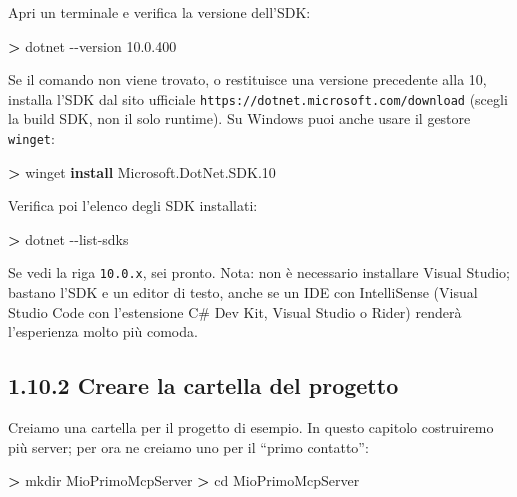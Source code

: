 \documentclass[
  italian,
  10pt,
]{book}
\newenvironment{Shaded}{\begin{snugshade}}{\end{snugshade}}
\newcommand{\ExtensionTok}[1]{#1}
\newcommand{\FunctionTok}[1]{\textcolor[rgb]{0.13,0.29,0.53}{\textbf{#1}}}
\newcommand{\NormalTok}[1]{#1}
\newcommand{\OperatorTok}[1]{\textcolor[rgb]{0.81,0.36,0.00}{\textbf{#1}}}
\begin{document}
Apri un terminale e verifica la versione dell'SDK:

\begin{Shaded}
\begin{Highlighting}[]
\OperatorTok{\textgreater{}}\NormalTok{ dotnet }\ExtensionTok{{-}{-}version}
\ExtensionTok{10.0.400}
\end{Highlighting}
\end{Shaded}

Se il comando non viene trovato, o restituisce una versione precedente
alla 10, installa l'SDK dal sito ufficiale
\texttt{https://dotnet.microsoft.com/download} (scegli la build SDK, non
il solo runtime). Su Windows puoi anche usare il gestore
\texttt{winget}:

\begin{Shaded}
\begin{Highlighting}[]
\OperatorTok{\textgreater{}}\NormalTok{ winget }\FunctionTok{install}\NormalTok{ Microsoft.DotNet.SDK.10}
\end{Highlighting}
\end{Shaded}

Verifica poi l'elenco degli SDK installati:

\begin{Shaded}
\begin{Highlighting}[]
\OperatorTok{\textgreater{}}\NormalTok{ dotnet }\ExtensionTok{{-}{-}list{-}sdks}
\end{Highlighting}
\end{Shaded}

Se vedi la riga \texttt{10.0.x}, sei pronto. Nota: non è necessario
installare Visual Studio; bastano l'SDK e un editor di testo, anche se
un IDE con IntelliSense (Visual Studio Code con l'estensione C\# Dev
Kit, Visual Studio o Rider) renderà l'esperienza molto più comoda.

\subsection{1.10.2 Creare la cartella del
progetto}\label{creare-la-cartella-del-progetto}

Creiamo una cartella per il progetto di esempio. In questo capitolo
costruiremo più server; per ora ne creiamo uno per il ``primo
contatto'':

\begin{Shaded}
\begin{Highlighting}[]
\OperatorTok{\textgreater{}}\NormalTok{ mkdir }\ExtensionTok{MioPrimoMcpServer}
\OperatorTok{\textgreater{}}\NormalTok{ cd }\ExtensionTok{MioPrimoMcpServer}
\end{Highlighting}
\end{Shaded}
\end{document}
